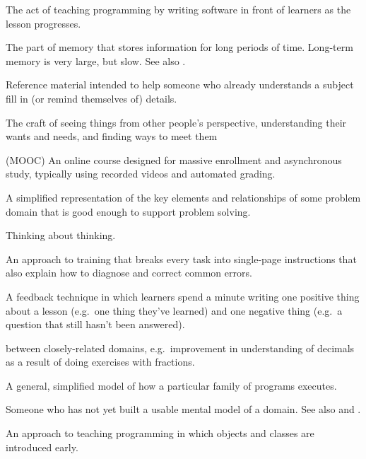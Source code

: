 \begin{description}
 The act of teaching programming by writing
software in front of learners as the lesson progresses.

 The part of memory that stores
information for long periods of time. Long-term memory is very large, but
slow. See also .

 Reference material intended to help someone who
already understands a subject fill in (or remind themselves of) details.

 The craft of seeing things from other people's
perspective, understanding their wants and needs, and finding ways to meet them

 (MOOC) An online course designed
for massive enrollment and asynchronous study, typically using recorded videos
and automated grading.

 A simplified representation of the key
elements and relationships of some problem domain that is good enough to support
problem solving.

 Thinking about thinking.

 An approach to training that breaks
every task into single-page instructions that also explain how to diagnose and
correct common errors.

 A feedback technique in which learners
spend a minute writing one positive thing about a lesson (e.g.\ one thing
they've learned) and one negative thing (e.g.\ a question that still hasn't been
answered).

 
between closely-related domains, e.g.\ improvement in understanding of decimals
as a result of doing exercises with fractions.

 A general, simplified model of how
a particular family of programs executes.

 Someone who has not yet built a usable mental model of
a domain. See also 
and .

 An approach to teaching programming in
which objects and classes are introduced early.


\end{description}
